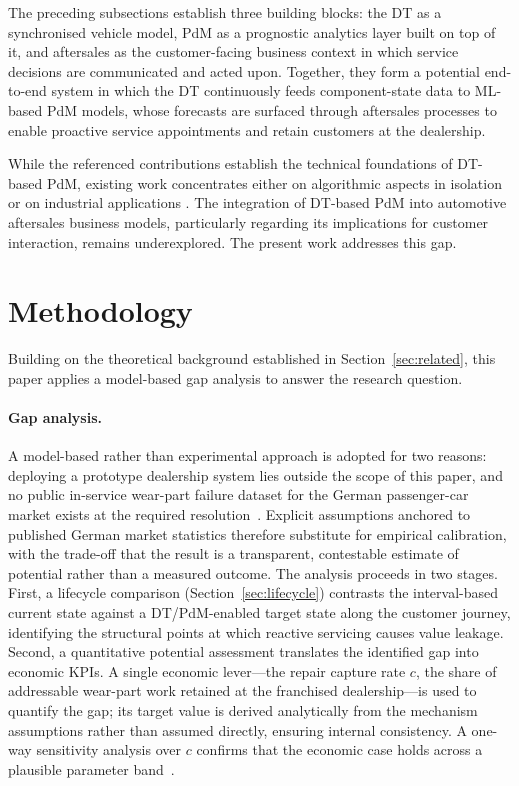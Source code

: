 \documentclass[conference,a4paper]{IEEEtran}
\begin{document}
The preceding subsections establish three building blocks: the DT as a synchronised vehicle model, PdM as a prognostic analytics layer built on top of it, and aftersales as the customer-facing business context in which service decisions are communicated and acted upon. Together, they form a potential end-to-end system in which the DT continuously feeds component-state data to ML-based PdM models, whose forecasts are surfaced through aftersales processes to enable proactive service appointments and retain customers at the dealership.

While the referenced contributions establish the technical foundations of DT-based PdM, existing work concentrates either on algorithmic aspects in isolation \cite{kumar2025suspension,abougrad2026xai} or on industrial applications \cite{wang2023review}. The integration of DT-based PdM into automotive aftersales business models, particularly regarding its implications for customer interaction, remains underexplored. The present work addresses this gap.
\section{Methodology}

Building on the theoretical background established in Section~\ref{sec:related},
this paper applies a model-based gap analysis to answer the research question.

\paragraph{Gap analysis.}
A model-based rather than experimental approach is adopted for two reasons:
deploying a prototype dealership system lies outside the scope of this paper,
and no public in-service wear-part failure dataset for the German passenger-car
market exists at the required resolution~\cite{abougrad2026xai}. Explicit
assumptions anchored to published German market statistics therefore substitute
for empirical calibration, with the trade-off that the result is a transparent,
contestable estimate of potential rather than a measured outcome.
The analysis proceeds in two stages. First, a lifecycle comparison
(Section~\ref{sec:lifecycle}) contrasts the interval-based current state against
a DT/PdM-enabled target state along the customer journey, identifying the
structural points at which reactive servicing causes value leakage. Second, a
quantitative potential assessment translates the identified gap into economic
KPIs. A single economic lever---the repair capture rate $c$, the share of
addressable wear-part work retained at the franchised dealership---is used to
quantify the gap; its target value is derived analytically from the mechanism
assumptions rather than assumed directly, ensuring internal consistency. A
one-way sensitivity analysis over $c$ confirms that the economic case holds
across a plausible parameter band~\cite{cooper_gap_2015}.
\end{document}
